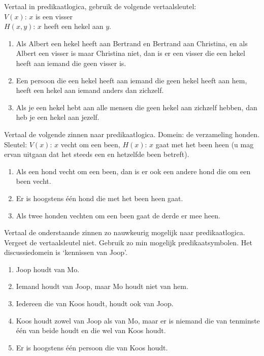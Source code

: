 \begin{exercise}
Vertaal in predikaatlogica, gebruik de volgende vertaalsleutel:\\
$V(x)$: $x$ is een visser\\
$H(x,y)$: $x$ heeft een hekel aan $y$.
\begin{enumerate}
    \item Als Albert een hekel heeft aan Bertrand en Bertrand aan Christina, en als Albert een visser is maar Christina niet, dan is er een visser die een hekel heeft aan iemand die geen visser is.
    \item Een persoon die een hekel heeft aan iemand die geen hekel heeft aan hem, heeft een hekel aan iemand anders dan zichzelf.
    \item Als je een hekel hebt aan alle mensen die geen hekel aan zichzelf hebben, dan heb je een hekel aan jezelf.
\end{enumerate}
\end{exercise}

\begin{exercise}
Vertaal de volgende zinnen naar predikaatlogica. Domein: de verzameling honden. Sleutel: $V(x)$: $x$ vecht om een been, $H(x)$: $x$ gaat met het been heen (u mag ervan uitgaan dat het steeds een en hetzelfde been betreft).
\begin{enumerate}
    \item Als een hond vecht om een been, dan is er ook een andere hond die om een been vecht.
    \item Er is hoogstens \'e\'en hond die met het been heen gaat.
    \item Als twee honden vechten om een been gaat de derde er mee heen.
\end{enumerate}
\end{exercise}

\begin{exercise}
Vertaal de onderstaande zinnen zo nauwkeurig mogelijk naar predikaatlogica. Vergeet de vertaalsleutel niet. Gebruik zo min mogelijk predikaatsymbolen. Het discussiedomein is `kennissen van Joop'.
\begin{enumerate}[label=\textit{\alph*.}]
    \item Joop houdt van Mo.
    \item Iemand houdt van Joop, maar Mo houdt niet van hem.
    \item Iedereen die van Koos houdt, houdt ook van Joop.
    \item Koos houdt zowel van Joop als van Mo, maar er is niemand die van tenminste \'e\'en van beide houdt en die wel van Koos houdt.
    \item Er is hoogstens \'e\'en persoon die van Koos houdt.
\end{enumerate}
\end{exercise}

